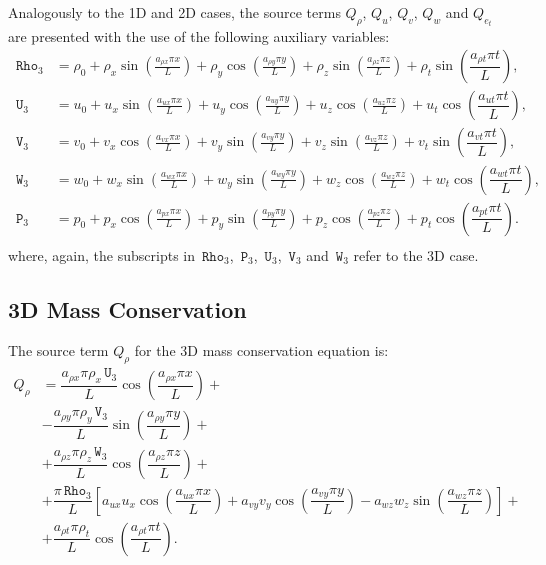\documentclass[10pt]{article}
\newcommand{\Rho}{\,\mathtt{Rho}}
\newcommand{\PP}{\,\mathtt{P}}
\newcommand{\U}{\,\mathtt{U}}
\newcommand{\V}{\,\mathtt{V}}
\newcommand{\W}{\,\mathtt{W}}
\begin{document}
Analogously to the 1D and 2D cases, the source terms $Q_\rho$, $Q_u$, $Q_v$, $Q_w$ and $Q_{e_t}$ are  presented with the use of the following auxiliary variables:
\begin{equation*}
 \begin{split}
\label{eq:aux}
\Rho_3 &= \rho_{0}+ \rho_{x} \sin\left(\frac{a_{ \rho  x} \pi x}{L}\right)+ \rho_{y} \cos\left(\frac{a_{ \rho  y} \pi y}{L}\right) + \rho_{z} \sin\left(\frac{a_{ \rho  z} \pi z}{L}\right)+ \rho_t \sin\left(\dfrac{a_{\rho t} \pi t}{L}\right),\\
\U_3 &=u_{0}+u_{x} \sin\left(\frac{a_{u  x} \pi x}{L}\right)+u_{y} \cos\left(\frac{a_{u  y} \pi y}{L}\right)+u_{z} \cos\left(\frac{a_{u  z} \pi z}{L}\right) + u_t \cos\left(\dfrac{a_{u t} \pi t}{L}\right) ,\\
\V_3 &= v_{0}+v_{x} \cos\left(\frac{a_{v  x} \pi x}{L}\right)+v_{y} \sin\left(\frac{a_{v  y} \pi y}{L}\right)+v_{z} \sin\left(\frac{a_{v  z} \pi z}{L}\right)+ v_t \sin\left(\dfrac{a_{v t} \pi t}{L}\right), \\
\W_3 &= w_{0}+w_{x} \sin\left(\frac{a_{w  x} \pi x}{L}\right)+w_{y} \sin\left(\frac{a_{w  y} \pi y}{L}\right)+ w_{z} \cos\left(\frac{a_{w  z} \pi z}{L}\right) + w_t \cos\left(\dfrac{a_{w t} \pi t}{L}\right),\\
\PP_3 &= p_{0}+p_{x} \cos\left(\frac{a_{p  x} \pi x}{L}\right)+p_{y} \sin\left(\frac{a_{p  y} \pi y}{L}\right)+ p_{z} \cos\left(\frac{a_{p  z} \pi z}{L}\right)+ p_t \cos\left(\dfrac{a_{p t} \pi t}{L}\right).\\
\end{split}
\end{equation*}
where, again, the subscripts in $\Rho_3$, $\PP_3$, $\U_3$, $\V_3$ and $\W_3$ refer to the 3D case.

\subsection{3D Mass Conservation}

The source term $Q_{\rho}$ for the 3D mass conservation equation is:
\begin{equation}
 \begin{split}
Q_\rho &=\dfrac{ a_{\rho x} \pi \rho_x \U_3}{L} \cos\left(\dfrac{a_{\rho x} \pi x}{L}\right)+\\
&-\dfrac{a_{\rho y} \pi \rho_y \V_3 }{L}\sin\left(\dfrac{a_{\rho y} \pi y}{L}\right)+\\
&+\dfrac{a_{\rho z} \pi \rho_z \W_3 }{L}\cos\left(\dfrac{a_{\rho z}\pi z }{L}\right)+\\
&+\dfrac{\pi \Rho_3}{L}\left[a_{ux} u_x \cos\left(\dfrac{a_{ux} \pi x}{L}\right)+a_{vy} v_y \cos\left(\dfrac{a_{vy} \pi y}{L}\right)-a_{wz} w_z \sin\left(\dfrac{a_{wz}\pi z }{L}\right)\right] +\\
&+  \dfrac{a_{\rho t} \pi \rho_t }{L}\cos\left(\dfrac{a_{\rho t} \pi t}{L}\right).
 \end{split}
\end{equation}
\end{document}
